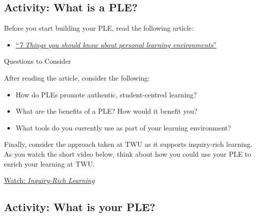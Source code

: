 \documentclass[
]{book}
\providecommand{\tightlist}{%
  \setlength{\itemsep}{0pt}\setlength{\parskip}{0pt}}
\theoremstyle{definition}
\theoremstyle{definition}
\theoremstyle{definition}
\theoremstyle{definition}
\theoremstyle{remark}
\begin{document}
\hypertarget{activity-what-is-a-ple}{%
\subsection*{Activity: What is a PLE?}\label{activity-what-is-a-ple}}

\begin{reflect}
Before you start building your PLE, read the following article:

\begin{itemize}
\tightlist
\item
  \href{assets/u4/U4_7-things-you-should-know-about-PLNs.pdf}{``\emph{7 Things you should know about personal learning environments}''}
\end{itemize}

{Questions to Consider}

After reading the article, consider the following:

\begin{itemize}
\tightlist
\item
  How do PLEs promote authentic, student-centred learning?\\
\item
  What are the benefits of a PLE? How would it benefit you?\\
\item
  What tools do you currently use as part of your learning environment?
\end{itemize}

Finally, consider the approach taken at TWU as it supports inquiry-rich learning. As you watch the short video below, think about how you could use your PLE to enrich your learning at TWU.

\href{https://www.youtube.com/watch?v=SCa9Nt3X1vU}{Watch: \emph{Inquiry-Rich Learning}}
\end{reflect}

\hypertarget{activity-what-is-your-ple}{%
\subsection*{Activity: What is your PLE?}\label{activity-what-is-your-ple}}
\end{document}
